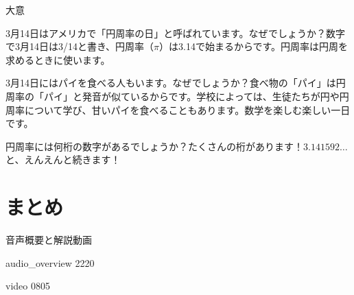 \documentclass[aspectratio=169,xcolor={dvipsnames,table}]{beamer}
\begin{document}
\begin{frame}[plain]{大意}

3月14日はアメリカで「円周率の日」と呼ばれています。なぜでしょうか？数字で3月14日は3/14と書き、円周率（$\pi$）は3.14で始まるからです。円周率は円周を求めるときに使います。

3月14日にはパイを食べる人もいます。なぜでしょうか？食べ物の「パイ」は円周率の「パイ」と発音が似ているからです。学校によっては、生徒たちが円や円周率について学び、甘いパイを食べることもあります。数学を楽しむ楽しい一日です。

円周率には何桁の数字があるでしょうか？たくさんの桁があります！$3.141592 \ldots$と、えんえんと続きます！
\end{frame}
\section{まとめ}
\begin{frame}[plain]{音声概要と解説動画}
 
{\tiny audio\_overview 2220}\,{\scriptsize {}}

{\tiny video 0805}\,{\scriptsize \href{./video/001_number_ja_subtitle.mp4}{}}
\end{frame}
\end{document}
